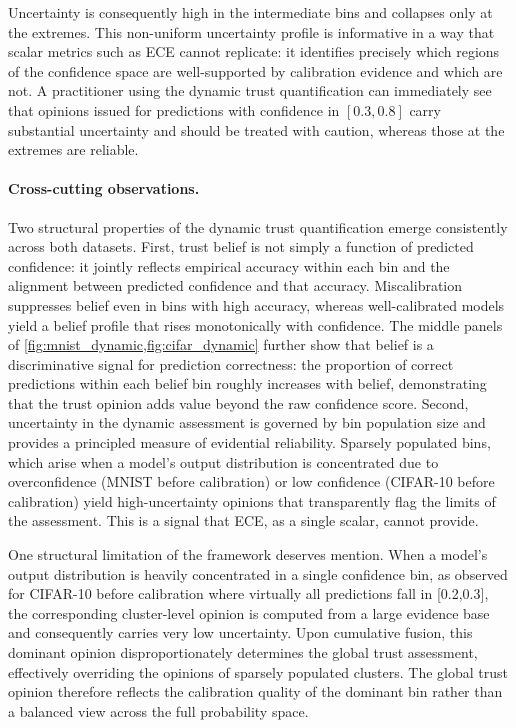 Uncertainty is consequently high in the intermediate bins and collapses only at the extremes. This non-uniform uncertainty profile is informative in a way that scalar metrics such as \ac{ECE} cannot replicate: it identifies precisely which regions of the confidence space are well-supported by calibration evidence and which are not. A practitioner using the dynamic trust quantification can immediately see that opinions issued for predictions with confidence in $[0.3, 0.8]$ carry substantial uncertainty and should be treated with caution, whereas those at the extremes are reliable.

\paragraph{Cross-cutting observations.}
Two structural properties of the dynamic trust quantification emerge consistently across both datasets. First, trust belief is not simply a function of predicted confidence: it jointly reflects empirical accuracy within each bin and the alignment between predicted confidence and that accuracy. Miscalibration suppresses belief even in bins with high accuracy, whereas well-calibrated models yield a belief profile that rises monotonically with confidence. The middle panels of \cref{fig:mnist_dynamic,fig:cifar_dynamic} further show that belief is a discriminative signal for prediction correctness: the proportion of correct predictions within each belief bin roughly increases with belief, demonstrating that the trust opinion adds value beyond the raw confidence score. Second, uncertainty in the dynamic assessment is governed by bin population size and provides a principled measure of evidential reliability. Sparsely populated bins, which arise when a model's output distribution is concentrated due to overconfidence (MNIST before calibration) or low confidence (CIFAR-10 before calibration) yield high-uncertainty opinions that transparently flag the limits of the assessment. This is a signal that \ac{ECE}, as a single scalar, cannot provide.


One structural limitation of the framework deserves mention. When a model's output distribution is heavily concentrated in a single confidence bin, as observed for CIFAR-10 before calibration where virtually all predictions fall in [0.2,0.3], the corresponding cluster-level opinion is computed from a large evidence base and consequently carries very low uncertainty. Upon cumulative fusion, this dominant opinion disproportionately determines the global trust assessment, effectively overriding the opinions of sparsely populated clusters. The global trust opinion therefore reflects the calibration quality of the dominant bin rather than a balanced view across the full probability space. 

